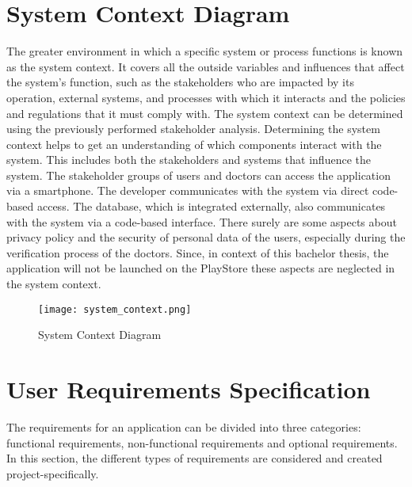 \section{System Context Diagram}
The greater environment in which a specific system or process functions is known as the system context. It covers all the outside variables and influences that affect the system's function, such as the stakeholders who are impacted by its operation, external systems, and processes with which it interacts and the policies and regulations that it must comply with. The system context can be determined using the previously performed stakeholder analysis. Determining the system context helps to get an understanding of which components interact with the system. This includes both the stakeholders and systems that influence the system.
The stakeholder groups of users and doctors can access the application via a smartphone. The developer communicates with the system via direct code-based access. The database, which is integrated externally, also communicates with the system via a code-based interface. There surely are some aspects about privacy policy and the security of personal data of the users, especially during the verification process of the doctors. Since, in context of this bachelor thesis, the application will not be launched on the PlayStore these aspects are neglected in the system context.

\begin{figure}[h!]
	\centering
	\texttt{[image: system\_context.png]}
	\caption[System Context Diagram ]{System Context Diagram}
\end{figure}

\section{User Requirements Specification}
The requirements for an application can be divided into three categories: functional requirements, non-functional requirements and optional requirements. In this section, the different types of requirements are considered and created project-specifically.

